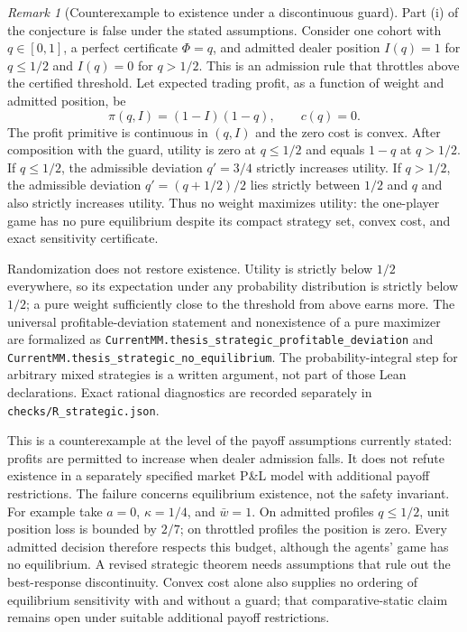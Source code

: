 \documentclass[11pt]{article}
\theoremstyle{definition}
\theoremstyle{remark}
\newtheorem{remark}[theorem]{Remark}
\begin{document}
\begin{remark}[Counterexample to existence under a discontinuous guard]\label{rem:strategic_counterexample}
Part (i) of the conjecture is false under the stated assumptions. Consider one cohort with $q\in[0,1]$, a perfect certificate $\Phi=q$, and admitted dealer position $I(q)=1$ for $q\le1/2$ and $I(q)=0$ for $q>1/2$. This is an admission rule that throttles above the certified threshold. Let expected trading profit, as a function of weight and admitted position, be
\[
\pi(q,I)=(1-I)(1-q),\qquad c(q)=0.
\]
The profit primitive is continuous in $(q,I)$ and the zero cost is convex. After composition with the guard, utility is zero at $q\le1/2$ and equals $1-q$ at $q>1/2$. If $q\le1/2$, the admissible deviation $q'=3/4$ strictly increases utility. If $q>1/2$, the admissible deviation $q'=(q+1/2)/2$ lies strictly between $1/2$ and $q$ and also strictly increases utility. Thus no weight maximizes utility: the one-player game has no pure equilibrium despite its compact strategy set, convex cost, and exact sensitivity certificate.

Randomization does not restore existence. Utility is strictly below $1/2$ everywhere, so its expectation under any probability distribution is strictly below $1/2$; a pure weight sufficiently close to the threshold from above earns more. The universal profitable-deviation statement and nonexistence of a pure maximizer are formalized as \nolinkurl{CurrentMM.thesis_strategic_profitable_deviation} and \nolinkurl{CurrentMM.thesis_strategic_no_equilibrium}. The probability-integral step for arbitrary mixed strategies is a written argument, not part of those Lean declarations. Exact rational diagnostics are recorded separately in \texttt{checks/R\_strategic.json}.

This is a counterexample at the level of the payoff assumptions currently stated: profits are permitted to increase when dealer admission falls. It does not refute existence in a separately specified market P\&L model with additional payoff restrictions. The failure concerns equilibrium existence, not the safety invariant. For example take $a=0$, $\kappa=1/4$, and $\bar w=1$. On admitted profiles $q\le1/2$, unit position loss is bounded by $2/7$; on throttled profiles the position is zero. Every admitted decision therefore respects this budget, although the agents' game has no equilibrium. A revised strategic theorem needs assumptions that rule out the best-response discontinuity. Convex cost alone also supplies no ordering of equilibrium sensitivity with and without a guard; that comparative-static claim remains open under suitable additional payoff restrictions.
\end{remark}
\end{document}
